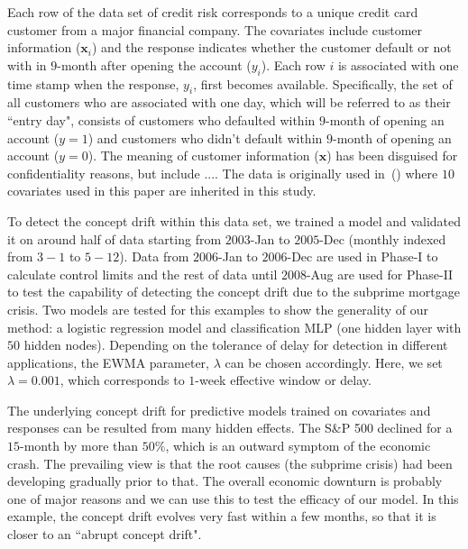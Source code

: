 \documentclass[twoside,11pt]{article}
\begin{document}
\begin{figure}[!htbp]
{%
}
\label{fig:credit_default}
\end{figure}
Each row of the data set of credit risk corresponds to a unique credit card customer from a major financial company. The covariates include customer information ($\bm {x}_i$) and the response indicates whether the customer default or not with in $9$-month after opening the account ($y_i$). Each row $i$ is associated with one time stamp when the response, $y_i$, first becomes available. Specifically, the set of all customers who are associated with one day, which will be referred to as their ``entry day", consists of customers who defaulted within $9$-month of opening an account ($y=1$) and customers who didn't default within $9$-month of opening an account ($y=0$). The meaning of customer information ($\bm {x}$) has been disguised for confidentiality reasons, but include .... The data is originally used in~(\cite{im2012time}) where $10$ covariates used in this paper are inherited in this study. 

To detect the concept drift within this data set, we trained a model and validated it on around half of data starting from $2003$-Jan to $2005$-Dec (monthly indexed from $3-1$ to $5-12$). Data from $2006$-Jan to $2006$-Dec are used in Phase-I to calculate control limits and the rest of data until $2008$-Aug are used for Phase-II to test the capability of detecting the concept drift due to the subprime mortgage crisis. Two models are tested for this examples to show the generality of our method: a logistic regression model and classification MLP (one hidden layer with $50$ hidden nodes). Depending on the tolerance of delay for detection in different applications, the EWMA parameter, $\lambda$ can be chosen accordingly. Here, we set $ \lambda = 0.001$, which corresponds to $1$-week effective window or delay.

The underlying concept drift for predictive models trained on covariates and responses can be resulted from many hidden effects. The S\&P 500 declined for a $15$-month by more than $50\%$, which is an outward symptom of the economic crash. The prevailing view is that the root causes (the subprime crisis) had been developing gradually prior to that. The overall economic downturn is probably one of major reasons and we can use this to test the efficacy of our model. In this example, the concept drift evolves very fast within a few months, so that it is closer to an ``abrupt concept drift".
\end{document}
